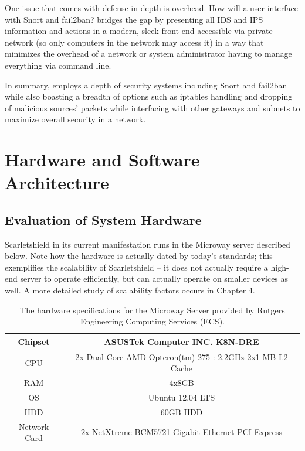 \documentclass[12pt,letterpaper,titlepage]{report}
\begin{document}
{One issue that comes with defense-in-depth is overhead.  How will a user
interface with Snort and fail2ban?  \scarletshield bridges the gap by presenting
all IDS and IPS information and actions in a modern, sleek front-end accessible
via private network (so only computers in the \scarletshield network may access
it) in a way that minimizes the overhead of a network or system administrator
having to manage everything via command line.

In summary, \scarletshield employs a depth of security systems including Snort
and fail2ban while also boasting a breadth of options such as iptables handling
and dropping of malicious sources’ packets while interfacing with other gateways
and subnets to maximize overall security in a network.

\chapter{Hardware and Software Architecture}

\section{Evaluation of System Hardware}

Scarletshield in its current manifestation runs in the 
Microway server described below. 
Note how the hardware is actually dated by today’s standards;
this exemplifies the scalability of Scarletshield -- it does not actually require
a high-end server to operate efficiently, but can actually operate on smaller
devices as well. A more detailed study of scalability factors occurs in Chapter 4.

\begin{table}
\centering
\renewcommand{\arraystretch}{1.5}
\begin{tabular}{|c|c|}
\hline
Chipset & ASUSTek Computer INC. K8N-DRE \\ \hline
CPU & 2x Dual Core AMD Opteron(tm) 275 : 2.2GHz 2x1 MB L2 Cache \\ \hline 
RAM & 4x8GB \\ \hline
OS & Ubuntu 12.04 LTS \\ \hline
HDD & 60GB HDD \\ \hline
Network Card & 2x NetXtreme BCM5721 Gigabit Ethernet PCI Express \\ \hline
\end{tabular}
\caption{The hardware specifications for the Microway Server provided by
Rutgers Engineering Computing Services (ECS).}
\end{table}

}
\end{document}

